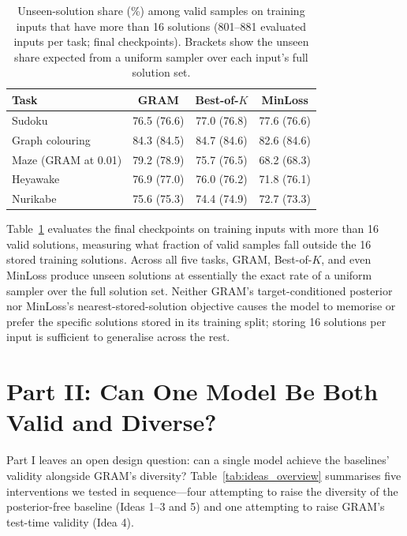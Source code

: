 \documentclass[11pt]{article}
\newcommand{\Bok}{Best-of-$K$}
\begin{document}
\begin{table}[!ht]
  \centering
  \small
  \begin{tabular}{@{}lccc@{}}
    \toprule
    \textbf{Task} & \textbf{GRAM} & \textbf{\Bok{}} & \textbf{MinLoss} \\
    \midrule
    Sudoku & 76.5 (76.6) & 77.0 (76.8) & 77.6 (76.6) \\
    Graph colouring & 84.3 (84.5) & 84.7 (84.6) & 82.6 (84.6) \\
    Maze (GRAM at 0.01) & 79.2 (78.9) & 75.7 (76.5) & 68.2 (68.3) \\
    Heyawake & 76.9 (77.0) & 76.0 (76.2) & 71.8 (76.1) \\
    Nurikabe & 75.6 (75.3) & 74.4 (74.9) & 72.7 (73.3) \\
    \bottomrule
  \end{tabular}
  \caption{Unseen-solution share (\%) among valid samples on training inputs that have more than 16 solutions (801--881 evaluated inputs per task; final checkpoints). Brackets show the unseen share expected from a uniform sampler over each input's full solution set.}
  \label{tab:q3}
\end{table}

Table~\ref{tab:q3} evaluates the final checkpoints on training inputs with more than 16 valid solutions, measuring what fraction of valid samples fall outside the 16 stored training solutions. Across all five tasks, GRAM, \Bok{}, and even MinLoss produce unseen solutions at essentially the exact rate of a uniform sampler over the full solution set. Neither GRAM's target-conditioned posterior nor MinLoss's nearest-stored-solution objective causes the model to memorise or prefer the specific solutions stored in its training split; storing 16 solutions per input is sufficient to generalise across the rest.

\section{Part II: Can One Model Be Both Valid and Diverse?}
\label{sec:ideas}

Part I leaves an open design question: can a single model achieve the baselines' validity alongside GRAM's diversity? Table~\ref{tab:ideas_overview} summarises five interventions we tested in sequence---four attempting to raise the diversity of the posterior-free baseline (Ideas 1--3 and 5) and one attempting to raise GRAM's test-time validity (Idea 4).
\end{document}
